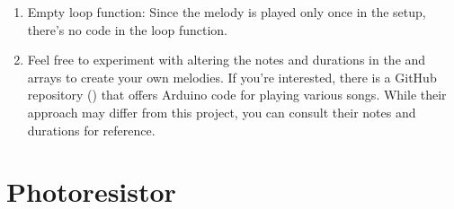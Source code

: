 \documentclass[a4paper,11pt,english]{sphinxmanual}
\begin{document}
\begin{enumerate}
\begin{sphinxVerbatim}[commandchars=\\\{\}]
\PYG{p}{[}\PYG{p}{]}
\PYG{p}{[}\PYG{p}{]}
\end{sphinxVerbatim}

\item {} 
\sphinxAtStartPar
Empty loop function:
Since the melody is played only once in the setup, there’s no code in the loop function.

\item {} 
\sphinxAtStartPar
Feel free to experiment with altering the notes and durations in the  and  arrays to create your own melodies. If you’re interested, there is a GitHub repository () that offers Arduino code for playing various songs. While their approach may differ from this project, you can consult their notes and durations for reference.

\end{enumerate}

\sphinxstepscope


\section{Photoresistor}
\label{\detokenize{Basic_Project/Photoresistor:photoresistor}}\label{\detokenize{Basic_Project/Photoresistor:basic-photoresistor}}\label{\detokenize{Basic_Project/Photoresistor::doc}}
\end{document}
